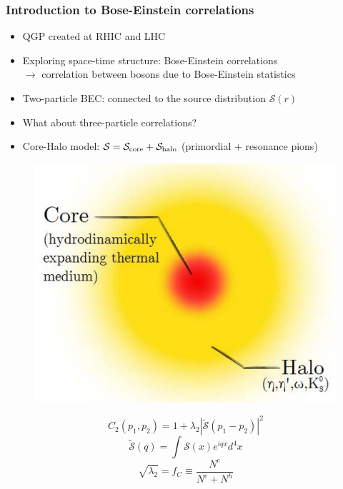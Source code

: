 \documentclass{beamer}
\begin{document}
\begin{frame}
\frametitle{Introduction to Bose-Einstein correlations}
\begin{itemize}
\setlength{\itemsep}{12pt}
\item QGP created at RHIC and LHC
\item Exploring space-time structure: Bose-Einstein correlations \\
$\longrightarrow$ correlation between bosons due to Bose-Einstein statistics
\item Two-particle BEC: connected to the source distribution $\mathcal{S}(r)$
\item What about three-particle correlations?
\item Core-Halo model: $\mathcal{S}=\mathcal{S}_{\rm core}+\mathcal{S}_{\rm halo}$ (primordial + resonance pions)
\end{itemize}

\begin{minipage}{0.4\textwidth}
\begin{figure}
\includegraphics[scale=0.3]{pic/corehalo2_eng}
\end{figure}
\end{minipage}
\begin{minipage}{0.59\textwidth}
\begin{equation*}
C_2(p_1, p_2) =  1+\lambda_2|\mathcal{\tilde{S}}(p_1-p_2)|^2
\end{equation*}
\begin{equation*}
\mathcal{\tilde{S}}(q) = \int \mathcal{S}(x)e^{iqx}d^4x
\end{equation*}
\begin{equation*}
\sqrt{\lambda_2} =  f_C \equiv \frac{N^c}{N^c+N^h}
\end{equation*}
\end{minipage}
\end{frame}
\end{document}
